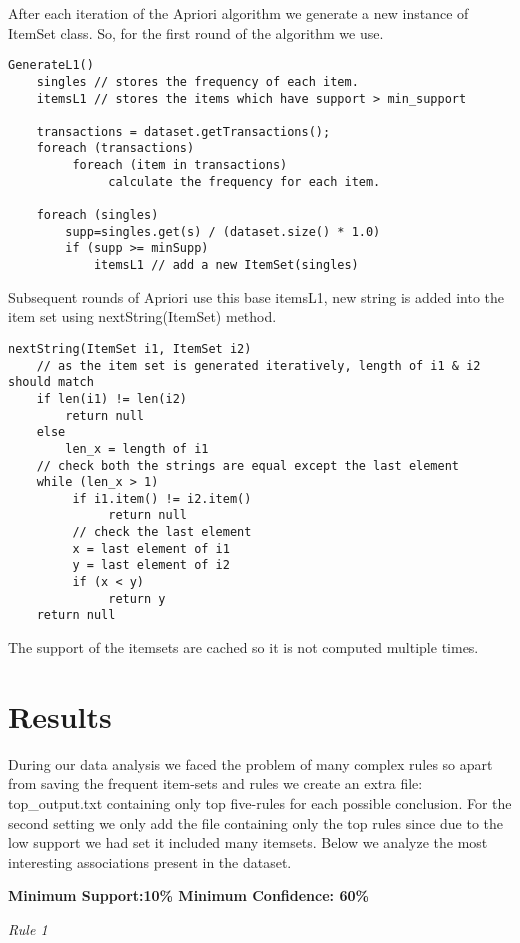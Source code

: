 \documentclass[11pt]{article}
\begin{document}
After each iteration of the Apriori algorithm we generate a new instance of ItemSet class.
So, for the first round of the algorithm we use.

\begin{verbatim}
GenerateL1()
    singles // stores the frequency of each item.
    itemsL1 // stores the items which have support > min_support
    
    transactions = dataset.getTransactions();
    foreach (transactions)
         foreach (item in transactions)
              calculate the frequency for each item.
    
    foreach (singles)
        supp=singles.get(s) / (dataset.size() * 1.0)
        if (supp >= minSupp) 
            itemsL1 // add a new ItemSet(singles)
\end{verbatim}

Subsequent rounds of Apriori use this base itemsL1, new string is added into the item set using nextString(ItemSet) method.

\begin{verbatim}
nextString(ItemSet i1, ItemSet i2)
    // as the item set is generated iteratively, length of i1 & i2 should match
    if len(i1) != len(i2)
        return null        
    else 
        len_x = length of i1
    // check both the strings are equal except the last element
    while (len_x > 1)
         if i1.item() != i2.item()
              return null
         // check the last element
         x = last element of i1
         y = last element of i2
         if (x < y)
              return y
    return null
\end{verbatim}

The support of the itemsets are cached so it is not computed multiple times.
\section{Results}

During our data analysis we faced the problem of many complex rules  so apart from saving the frequent item-sets and rules we create an extra file: top\_output.txt containing only top five-rules for each possible conclusion. For the second setting we only add the file containing only the top rules since due to the low support we had set it included many itemsets. Below we analyze the most interesting associations present in the dataset.

\textbf{Minimum Support:10\% Minimum Confidence: 60\%}

\textit{Rule 1}
\end{document}
